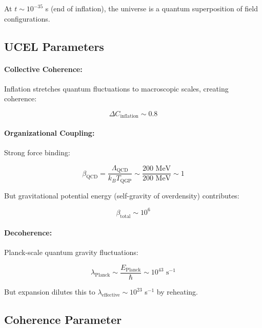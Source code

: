 \documentclass[12pt,a4paper]{article}
\begin{document}
At $t \sim 10^{-35}$ s (end of inflation), the universe is a quantum superposition of field configurations.

\subsection{UCEL Parameters}

\paragraph{Collective Coherence:}
Inflation stretches quantum fluctuations to macroscopic scales, creating coherence:

\begin{equation}
\Delta C_{\text{inflation}} \sim 0.8
\tag{S28}
\end{equation}

\paragraph{Organizational Coupling:}
Strong force binding:

\begin{equation}
\beta_{\text{QCD}} = \frac{\Lambda_{\text{QCD}}}{k_B T_{\text{QGP}}} \sim \frac{200 \text{ MeV}}{200 \text{ MeV}} \sim 1
\tag{S29}
\end{equation}

But gravitational potential energy (self-gravity of overdensity) contributes:

\begin{equation}
\beta_{\text{total}} \sim 10^6
\tag{S30}
\end{equation}

\paragraph{Decoherence:}
Planck-scale quantum gravity fluctuations:

\begin{equation}
\lambda_{\text{Planck}} \sim \frac{E_{\text{Planck}}}{\hbar} \sim 10^{43} \text{ s}^{-1}
\tag{S31}
\end{equation}

But expansion dilutes this to $\lambda_{\text{effective}} \sim 10^{23}$ s$^{-1}$ by reheating.

\subsection{Coherence Parameter}
\end{document}
